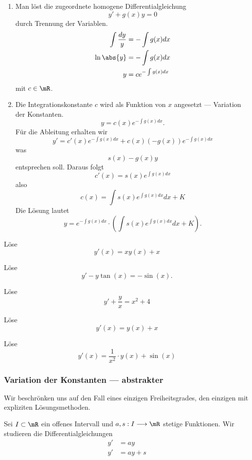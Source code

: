 \documentclass[%
draft,
11pt,%
twoside,%
titlepage,%
german,%
headsepline%
]{scrartcl}
\begin{document}
\begin{enumerate}
\item Man l\"ost die zugeordnete homogene Differentialgleichung
$$y'+g(x)y=0$$
durch Trennung der Variablen.
\begin{align*}
\int\frac{dy}{y} &= -\int g(x)dx\\
\ln\abs{y} &= -\int g(x)dx\\
y &= ce^{-\int g(x)dx}
\end{align*}
mit $c\in\mR$.
\item Die
Integrationskonstante $c$ wird als Funktion von $x$ angesetzt --- Variation der Konstanten.
$$y=c(x)e^{-\int g(x)dx}.$$
F\"ur die Ableitung erhalten wir
$$y' = c'(x)e^{-\int g(x)dx}+c(x)(-g(x))e^{-\int g(x)dx}$$
was
$$s(x)-g(x)y$$
entsprechen soll. Daraus folgt
$$c'(x)=s(x)e^{\int g(x)dx}$$
also
$$c(x)=\int s(x)e^{\int g(x)dx}dx+K$$
Die L\"osung lautet
$$y=e^{-\int g(x)dx}\cdot\left(\int s(x)e^{\int g(x)dx}dx+K\right).$$
\end{enumerate}

\begin{ueb}
L\"ose
$$y'(x)=xy(x)+x$$
\end{ueb}

\begin{ueb}
L\"ose
$$y'-y\tan(x)=-\sin(x).$$
\end{ueb}

\begin{ueb}
L\"ose
$$y'+\frac{y}{x}=x^2+4$$
\end{ueb}

\begin{ueb}
L\"ose
$$y'(x)=y(x)+x$$
\end{ueb}

\begin{ueb}
L\"ose
$$y'(x)=\frac{1}{x^2}\cdot y(x)+\sin(x)$$
\end{ueb}

\subsubsection{Variation der Konstanten --- abstrakter}

Wir beschr\"onken uns auf den Fall eines einzigen Freiheitsgrades, den einzigen mit expliziten L\"osungsmethoden.

Sei $I\subset\mR$ ein offenes Intervall und $a,s:I\longrightarrow\mR$ stetige Funktionen. Wir studieren die Differentialgleichungen
\begin{align}
y' &= ay\\
y' &=ay+s
\end{align}
\end{document}
